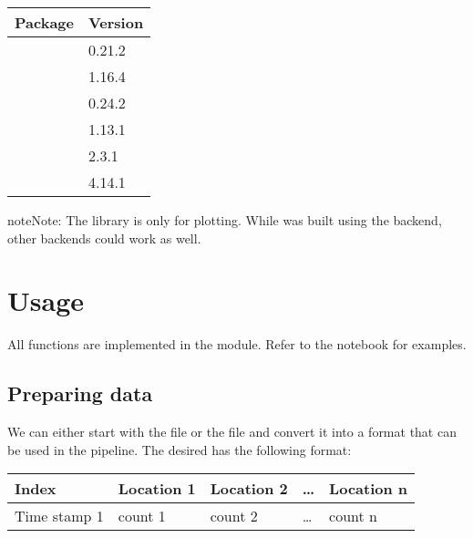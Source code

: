 \documentclass[letterpaper,10pt,english]{sphinxmanual}
\begin{document}
\begin{savenotes}\sphinxattablestart
\centering
\begin{tabulary}{\linewidth}[t]{|T|T|}
\hline
\sphinxstyletheadfamily 
Package
&\sphinxstyletheadfamily 
Version
\\
\hline
{}
&
0.21.2
\\
\hline
{}
&
1.16.4
\\
\hline
{}
&
0.24.2
\\
\hline
{}
&
1.13.1
\\
\hline
{}
&
2.3.1
\\
\hline
{}
&
4.14.1
\\
\hline
\end{tabulary}
\par
\sphinxattableend\end{savenotes}

\begin{sphinxadmonition}{note}{Note:}
The  library is only for plotting. While  was built using the  backend, other backends could work as well.
\end{sphinxadmonition}


\section{Usage}
\label{\detokenize{manual:usage}}
All functions are implemented in the  module. Refer to the  notebook for examples.


\subsection{Preparing data}
\label{\detokenize{manual:preparing-data}}
We can either start with the  file or the  file and convert it into a format that can be used in the pipeline. The desired  has the following format:


\begin{savenotes}\sphinxattablestart
\centering
\begin{tabulary}{\linewidth}[t]{|T|T|T|T|T|}
\hline
\sphinxstyletheadfamily 
Index
&\sphinxstyletheadfamily 
Location 1
&\sphinxstyletheadfamily 
Location 2
&\sphinxstyletheadfamily 
…
&\sphinxstyletheadfamily 
Location n
\\
\hline
Time stamp 1
&
count 1
&
count 2
&
…
&
count n
\\
\hline
\end{tabulary}
\par
\sphinxattableend\end{savenotes}
\end{document}

